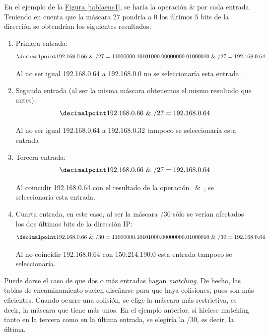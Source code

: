 \documentclass[10pt,a4paper,spanish]{report}
\begin{document}
En el ejemplo de la \hyperref[tablaenc1]{Figura \ref*{tablaenc1}}, se haría la operación $\&$ por cada entrada. Teniendo en cuenta que la máscara 27 pondría a 0 los últimos 5 bits de la dirección se obtendrían los siguientes resultados:
\begin{enumerate}[\color{tema4}{$\heartsuit$}]
  \item Primera entrada:
  \begin{displaymath}
  \decimalpoint
    192.168.0.66 ~\&~ /27 = 11000000.10101000.00000000.01000010 ~\&~ /27 = 192.168.0.64
  \end{displaymath}

  Al no ser igual 192.168.0.64 a 192.168.0.0 no se seleccionaría esta entrada.

  \item Segunda entrada (al ser la misma máscara obtenemos el mismo resultado que antes):
  \begin{displaymath}
  \decimalpoint
    192.168.0.66 ~\&~ /27 = 192.168.0.64
  \end{displaymath}

  Al no ser igual 192.168.0.64 a 192.168.0.32 tampoco se seleccionaría esta entrada

  \item Tercera entrada:
  \begin{displaymath}
  \decimalpoint
    192.168.0.66 ~\&~ /27 = 192.168.0.64
  \end{displaymath}

  Al coincidir 192.168.0.64 con el resultado de la operación ~\&~, se seleccionaría esta entrada.

  \item Cuarta entrada, en este caso, al ser la máscara /30 sólo se verían afectados los dos últimos bits de la dirección IP:
  \begin{displaymath}
  \decimalpoint
    192.168.0.66 ~\&~ /30 = 11000000.10101000.00000000.01000010 ~\&~ /30 = 192.168.0.64 
  \end{displaymath}

  Al no coincidir 192.168.0.64 con 150.214.190.0 esta entrada tampoco se seleccionaría.
\end{enumerate}

Puede darse el caso de que dos o más entradas hagan \textit{\textcolor{tema4}{matching}}. De hecho, las tablas de encaminamiento suelen diseñarse para que haya colisiones, pues son más eficientes. Cuando ocurre una colisión, se elige la máscara más restrictiva, es decir, la máscara que tiene más unos. En el ejemplo anterior, si hiciese matching tanto en la tercera como en la última entrada, se elegiría la /30, es decir, la última.
\end{document}

